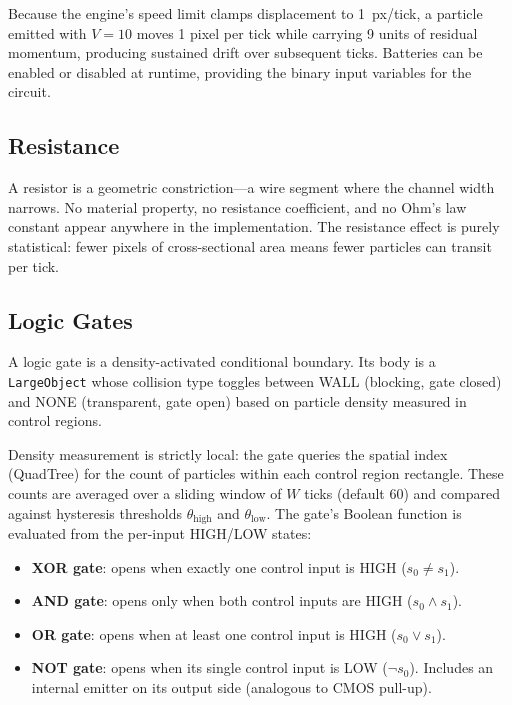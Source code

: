 \documentclass[11pt,a4paper]{article}
\begin{document}
Because the engine's speed limit clamps displacement to 1~px/tick, a particle emitted with $V = 10$ moves 1 pixel per tick while carrying 9 units of residual momentum, producing sustained drift over subsequent ticks. Batteries can be enabled or disabled at runtime, providing the binary input variables for the circuit.

\subsection{Resistance}

A resistor is a geometric constriction---a wire segment where the channel width narrows. No material property, no resistance coefficient, and no Ohm's law constant appear anywhere in the implementation. The resistance effect is purely statistical: fewer pixels of cross-sectional area means fewer particles can transit per tick.

\subsection{Logic Gates}

A logic gate is a density-activated conditional boundary. Its body is a \texttt{LargeObject} whose collision type toggles between WALL (blocking, gate closed) and NONE (transparent, gate open) based on particle density measured in control regions.

Density measurement is strictly local: the gate queries the spatial index (QuadTree) for the count of particles within each control region rectangle. These counts are averaged over a sliding window of $W$ ticks (default 60) and compared against hysteresis thresholds $\theta_{\text{high}}$ and $\theta_{\text{low}}$. The gate's Boolean function is evaluated from the per-input HIGH/LOW states:

\begin{itemize}
    \item \textbf{XOR gate}: opens when exactly one control input is HIGH ($s_0 \neq s_1$).
    \item \textbf{AND gate}: opens only when both control inputs are HIGH ($s_0 \land s_1$).
    \item \textbf{OR gate}: opens when at least one control input is HIGH ($s_0 \lor s_1$).
    \item \textbf{NOT gate}: opens when its single control input is LOW ($\neg s_0$). Includes an internal emitter on its output side (analogous to CMOS pull-up).
\end{itemize}
\end{document}
